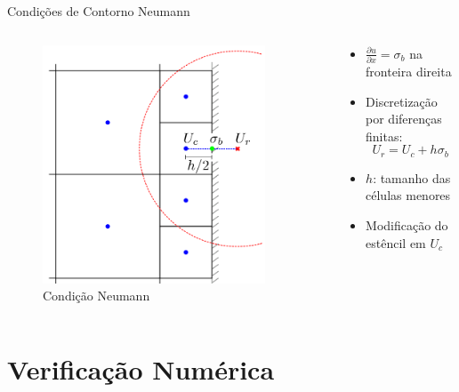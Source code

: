 \documentclass[../main/main.tex]{subfiles}
\begin{document}
\begin{frame}{Condições de Contorno Neumann}
\begin{columns}[T]
\begin{column}{0.5\textwidth}
\begin{figure}
\centering
\includegraphics[width=0.9\textwidth]{imgs/figura3b.png}
\caption{Condição Neumann}
\end{figure}
\end{column}
\begin{column}{0.5\textwidth}
\begin{itemize}
\item $\frac{\partial u}{\partial x} = \sigma_b$ na fronteira direita
\item Discretização por diferenças finitas:
\[
U_r = U_c + h\sigma_b
\]
\item $h$: tamanho das células menores
\item Modificação do estêncil em $U_c$
\end{itemize}
\end{column}
\end{columns}
\end{frame}

\section{Verificação Numérica}
\end{document}
